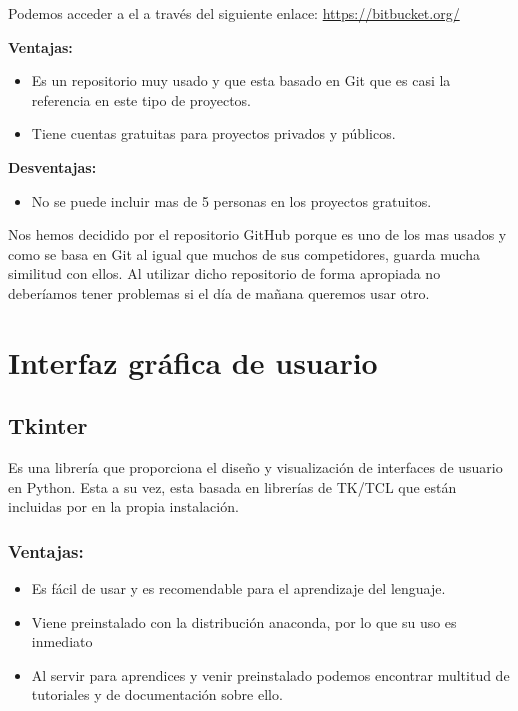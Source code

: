 Podemos acceder a el a través del siguiente enlace: 
\url{https://bitbucket.org/}


\textbf{Ventajas:}
\begin{itemize}

\item Es un repositorio muy usado y que esta basado en Git que es casi la referencia en este tipo de proyectos.

\item Tiene cuentas gratuitas para proyectos privados y públicos.

\end{itemize}

\textbf{Desventajas:}

\begin{itemize}
\item No se puede incluir mas de 5 personas en los proyectos gratuitos.
\end{itemize}

Nos hemos decidido por el repositorio GitHub porque es uno de los mas usados y como se basa en Git al igual que muchos de sus competidores, guarda mucha similitud con ellos.
Al utilizar dicho repositorio de forma apropiada no deberíamos tener problemas si el día de mañana queremos usar otro.


\section{Interfaz gráfica de usuario}
\subsection{Tkinter}
Es una librería que proporciona el diseño y visualización de interfaces de usuario en Python. Esta a su vez, esta basada en librerías de TK/TCL que están incluidas por en la propia instalación.

\subsubsection{Ventajas:}
\begin{itemize}
\item Es fácil de usar y es recomendable para el aprendizaje del lenguaje.

\item Viene preinstalado con la distribución anaconda, por lo que su uso es inmediato

\item Al servir para aprendices y venir preinstalado podemos encontrar multitud de tutoriales y de documentación sobre ello.
\end{itemize}

